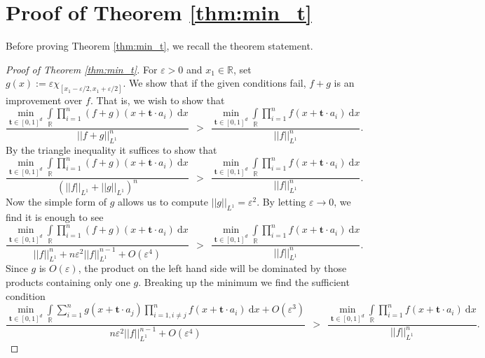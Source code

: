 \documentclass[11pt,reqno]{amsart}
\numberwithin{equation}{section}
\theoremstyle{plain}
\newcommand{\R}{\ensuremath{\mathbb{R}}}
\newcommand{\e}{\varepsilon}
\begin{document}
\section{Proof of Theorem \ref{thm:min_t}}\label{section:proofs}
Before proving Theorem \ref{thm:min_t}, we recall the theorem statement.
\thetheorem*
\begin{proof}[Proof of Theorem \ref{thm:min_t}]
For $\e > 0$ and $x_1 \in \R$, set $g(x):=\e \chi_{[x_1-\e/2,x_1+\e/2]}$. We show that if the given conditions fail, $f+g$ is an improvement over $f$. That is, we wish to show that
\begin{equation}
    \frac{\min\limits_{\mathbf{t}\in[0,1]^d}\displaystyle\int\limits_{\R}\prod\limits_{i=1}^{n}(f+g)(x+\mathbf{t}\cdot a_i)\ \mathrm{d}x}{||f+g||_{L^1}^{n}}\ \ > \ \  \frac{\min\limits_{\mathbf{t}\in[0,1]^d}\displaystyle\int\limits_{\R}\prod\limits_{i=1}^{n}f(x+\mathbf{t}\cdot a_i)\ \mathrm{d}x}{||f||_{L^1}^{n}}.
\end{equation}
By the triangle inequality it suffices to show that
\begin{equation}
    \frac{\min\limits_{\mathbf{t}\in[0,1]^d}\displaystyle\int\limits_{\R}\prod\limits_{i=1}^{n}(f+g)(x+\mathbf{t}\cdot a_i)\ \mathrm{d}x}{(||f||_{L^1}+||g||_{L^1})^{n}}\ \ > \ \  \frac{\min\limits_{\mathbf{t}\in[0,1]^d}\displaystyle\int\limits_{\R}\prod\limits_{i=1}^{n}f(x+\mathbf{t}\cdot a_i)\ \mathrm{d}x}{||f||_{L^1}^{n}}.
\end{equation}
Now the simple form of $g$ allows us to compute $||g||_{L^1}=\e^2$. By letting $\e \to 0$, we find it is enough to see
\begin{equation}
    \frac{\min\limits_{\mathbf{t}\in[0,1]^d}\displaystyle\int\limits_{\R}\prod\limits_{i=1}^{n}(f+g)(x+\mathbf{t}\cdot a_i)\ \mathrm{d}x}{||f||_{L^1}^n+n\e^2||f||_{L^1}^{n-1}+O(\e^4)}\ \ > \ \  \frac{\min\limits_{\mathbf{t}\in[0,1]^d}\displaystyle\int\limits_{\R}\prod\limits_{i=1}^{n}f(x+\mathbf{t}\cdot a_i)\ \mathrm{d}x}{||f||_{L^1}^{n}}.
\end{equation}
Since $g$ is $O(\e)$, the product on the left hand side will be dominated by those products containing only one $g$. Breaking up the minimum we find the sufficient condition
\begin{equation}
    \frac{\min\limits_{\mathbf{t}\in[0,1]^d}\displaystyle\int\limits_{\R}\sum\limits_{i=1}^{n}g(x+\mathbf{t}\cdot a_j)\prod\limits_{i=1,i\neq j}^{n}f(x+\mathbf{t}\cdot a_i)\ \mathrm{d}x+O(\e^3)}{n\e^2||f||_{L^1}^{n-1}+O(\e^4)}\ \ > \ \  \frac{\min\limits_{\mathbf{t}\in[0,1]^d}\displaystyle\int\limits_{\R}\prod\limits_{i=1}^{n}f(x+\mathbf{t}\cdot a_i)\ \mathrm{d}x}{||f||_{L^1}^{n}}.

\end{equation}
\end{proof}
\end{document}
